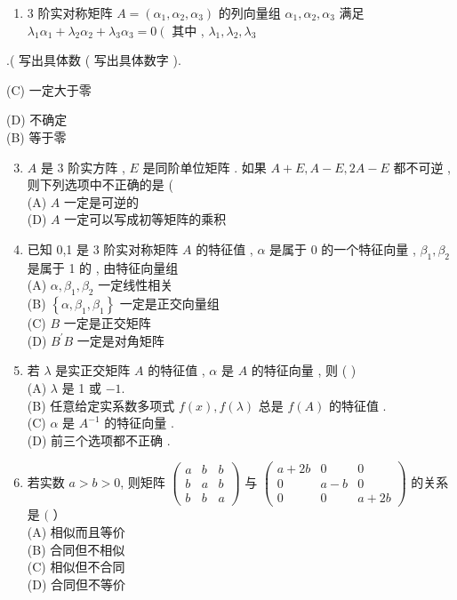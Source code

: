 \documentclass[10pt]{article}
\begin{document}
{\begin{enumerate}
  \item 3  阶实对称矩阵  $A=\left(\alpha_{1}, \alpha_{2}, \alpha_{3}\right)$  的列向量组  $\alpha_{1}, \alpha_{2}, \alpha_{3}$  满足  $\lambda_{1} \alpha_{1}+\lambda_{2} \alpha_{2}+\lambda_{3} \alpha_{3}=0\left(\right.$  其中 , $\lambda_{1}, \lambda_{2}, \lambda_{3}$

\end{enumerate}
.( 写出具体数  ( 写出具体数字 ).

(C)  一定大于零 

(D)  不确定 \\
(B)  等于零 

\begin{enumerate}
  \setcounter{enumi}{2}
  \item $A$  是  3  阶实方阵 , $E$  是同阶单位矩阵 .  如果  $A+E, A-E, 2 A-E$  都不可逆 ,  则下列选项中不正确的是  (\\
(A) $A$  一定是可逆的 \\
(D) $A$  一定可以写成初等矩阵的乘积 

  \item  已知  0,1  是  3  阶实对称矩阵  $A$  的特征值 , $\alpha$  是属于  0  的一个特征向量 , $\beta_{1}, \beta_{2}$  是属于  1  的 ,  由特征向量组 \\
(A) $\alpha, \beta_{1}, \beta_{2}$  一定线性相关 \\
(B) $\left\{\alpha, \beta_{1}, \beta_{1}\right\}$  一定是正交向量组 \\
(C) $B$  一定是正交矩阵 \\
(D) $B^{\prime} B$  一定是对角矩阵 

  \item  若  $\lambda$  是实正交矩阵  $A$  的特征值 , $\alpha$  是  $A$  的特征向量 ,  则 ( )\\
(A) $\lambda$  是  1  或  $-1$.\\
(B)  任意给定实系数多项式  $f(x), f(\lambda)$  总是  $f(A)$  的特征值 .\\
(C) $\alpha$  是  $A^{-1}$  的特征向量 .\\
(D)  前三个选项都不正确 .

  \item  若实数  $a>b>0$,  则矩阵  $\left(\begin{array}{ccc}a & b & b \\ b & a & b \\ b & b & a\end{array}\right)$  与  $\left(\begin{array}{ccc}a+2 b & 0 & 0 \\ 0 & a-b & 0 \\ 0 & 0 & a+2 b\end{array}\right)$  的关系是  $($ ）\\
(A)  相似而且等价 \\
(B)  合同但不相似 \\
(C)  相似但不合同 \\
(D)  合同但不等价 


\end{enumerate}}
\end{document}
